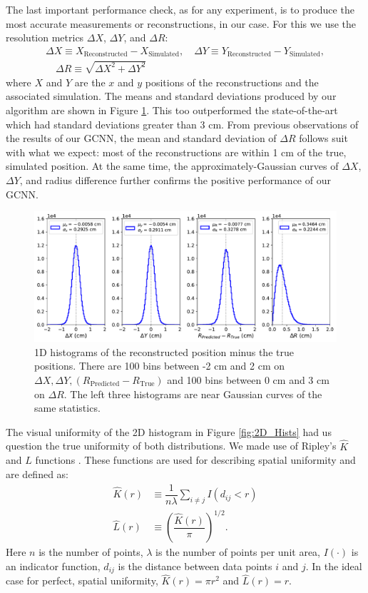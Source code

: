 \documentclass[thesis.tex]{subfiles}
\begin{document}
\par The last important performance check, as for any experiment, is to produce the most accurate measurements or reconstructions, in our case.
For this we use the resolution metrics $\Delta X$, $\Delta Y$, and $\Delta R$:
\begin{gather*}
	\Delta X \equiv X_\text{Reconstructed} - X_\text{Simulated},
	\quad \Delta Y \equiv Y_\text{Reconstructed} - Y_\text{Simulated}, \\
	\quad \Delta R \equiv \sqrt{ \Delta X^2 + \Delta Y^2 }
\end{gather*}
where $X$ and $Y$ are the $x$ and $y$ positions of the reconstructions and the associated simulation.
The means and standard deviations produced by our algorithm are shown in Figure \ref{fig:1D_Hist}.
This too outperformed the state-of-the-art which had standard deviations greater than 3 cm.
From previous observations of the results of our GCNN, the mean and standard deviation of $\Delta R$ follows suit with what we expect: most of the reconstructions are within 1 cm of the true, simulated position.
At the same time, the approximately-Gaussian curves of $\Delta X$, $\Delta Y$, and radius difference further confirms the positive performance of our GCNN.
\begin{figure}[t]
	\centering
	\includegraphics[width=0.9\linewidth]{figures/1D_hist_Delaunay-Prenoise.pdf}
	\caption{
	1D histograms of the reconstructed position minus the true positions.
	There are 100 bins between -2 cm and 2 cm on $\Delta X, \Delta Y, (R_\text{Predicted} - R_\text{True})$ and 100 bins between 0 cm and 3 cm on $\Delta R$.
	The left three histograms are near Gaussian curves of the same statistics.
	}
	\label{fig:1D_Hist}
\end{figure}

\par The visual uniformity of the 2D histogram in Figure \ref{fig:2D_Hists} had us question the true uniformity of both distributions.
We made use of Ripley's $\widehat{K}$ and $\widehat{L}$ functions \cite{Ripley}.
These functions are used for describing spatial uniformity and are defined as:
\begin{align*}
	\widehat{K}(r) &\equiv \dfrac{1}{n\lambda} \sum_{i \neq j} I(d_{ij} < r) \\
	\widehat{L}(r) &\equiv \left( \dfrac{\widehat{K}(r)}{\pi} \right)^{1/2} .
\end{align*}
Here $n$ is the number of points, $\lambda$ is the number of points per unit area, $I(\cdot)$ is an indicator function, $d_{ij}$ is the distance between data points $i$ and $j$.
In the ideal case for perfect, spatial uniformity, $\widehat{K}(r) = \pi r^2$ and $\widehat{L}(r) = r$.
\end{document}
